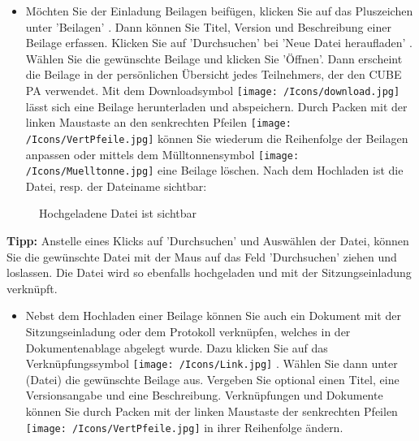 \begin{itemize}
\item 
Möchten Sie der Einladung Beilagen beifügen, klicken Sie auf das Pluszeichen unter 'Beilagen' . Dann können Sie Titel, Version und Beschreibung einer Beilage erfassen. Klicken Sie auf 'Durchsuchen' bei 'Neue Datei heraufladen' . Wählen Sie die gewünschte Beilage und klicken Sie 'Öffnen'. Dann erscheint die Beilage in der persönlichen Übersicht jedes Teilnehmers, der den CUBE PA verwendet. Mit dem Downloadsymbol \texttt{[image: /Icons/download.jpg]}  lässt sich eine Beilage herunterladen und abspeichern. Durch Packen mit der linken Maustaste an den senkrechten Pfeilen \texttt{[image: /Icons/VertPfeile.jpg]} können Sie wiederum die Reihenfolge der Beilagen anpassen oder mittels dem Mülltonnensymbol \texttt{[image: /Icons/Muelltonne.jpg]}  eine Beilage löschen. Nach dem Hochladen ist die Datei, resp. der Dateiname sichtbar:
\end{itemize}

\begin{figure}[H]
\caption{Hochgeladene Datei ist sichtbar}
\end{figure}

\textbf{Tipp:} Anstelle eines Klicks auf 'Durchsuchen' und Auswählen der Datei, können Sie die gewünschte Datei mit der Maus auf das Feld 'Durchsuchen' ziehen und loslassen. Die Datei wird so ebenfalls hochgeladen und mit der Sitzungseinladung verknüpft.

\vspace{\baselineskip}

\begin{itemize}
\item 
Nebst dem Hochladen einer Beilage können Sie auch ein Dokument mit der Sitzungseinladung oder dem Protokoll verknüpfen, welches in der Dokumentenablage abgelegt wurde. Dazu klicken Sie auf das Verknüpfungssymbol \texttt{[image: /Icons/Link.jpg]} . Wählen Sie dann unter  (Datei) die gewünschte Beilage aus. Vergeben Sie optional einen Titel, eine Versionsangabe und eine Beschreibung. Verknüpfungen und Dokumente können Sie durch Packen mit der linken Maustaste der senkrechten Pfeilen \texttt{[image: /Icons/VertPfeile.jpg]} in ihrer Reihenfolge ändern.
\end{itemize}

